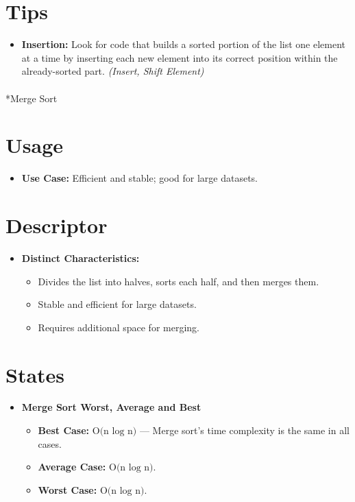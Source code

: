 \documentclass[
  letterpaper,
  DIV=11,
  numbers=noendperiod]{scrreprt}
\makeatletter
\let\oldparagraph\paragraph
\renewcommand{\paragraph}{
    \@ifstar
      \xxxParagraphStar
      \xxxParagraphNoStar
  }
\newcommand{\xxxParagraphStar}[1]{\oldparagraph*{#1}\mbox{}}
\newcommand{\xxxParagraphNoStar}[1]{\oldparagraph{#1}\mbox{}}
\providecommand{\tightlist}{%
  \setlength{\itemsep}{0pt}\setlength{\parskip}{0pt}}
\makeatother
\begin{document}
\section{Tips}

\begin{itemize}
\tightlist
\item
  \textbf{Insertion:} Look for code that builds a sorted portion of the
  list one element at a time by inserting each new element into its
  correct position within the already-sorted part. \emph{(Insert, Shift
  Element)}
\end{itemize}

\paragraph*{Merge Sort}\label{merge-sort}

\section{Usage}

\begin{itemize}
\tightlist
\item
  \textbf{Use Case:} Efficient and stable; good for large datasets.
\end{itemize}

\section{Descriptor}

\begin{itemize}
\item
  \textbf{Distinct Characteristics:}

  \begin{itemize}
  \tightlist
  \item
    Divides the list into halves, sorts each half, and then merges them.
  \item
    Stable and efficient for large datasets.
  \item
    Requires additional space for merging.
  \end{itemize}
\end{itemize}

\section{States}

\begin{itemize}
\item
  \textbf{Merge Sort Worst, Average and Best}

  \begin{itemize}
  \tightlist
  \item
    \textbf{Best Case:} \(\text{O(n ⁡log⁡ n)}\) --- Merge sort's time
    complexity is the same in all cases.
  \item
    \textbf{Average Case:} \(\text{O(n ⁡log⁡ n)}\).
  \item
    \textbf{Worst Case:} \(\text{O(n ⁡log⁡ n)}\).
  \end{itemize}
\end{itemize}
\end{document}
